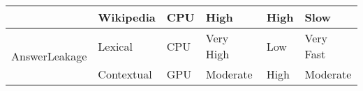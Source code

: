 \begin{table}[t]
{\begin{tabular}{@{}llllll@{}}
                               & Wikipedia        & CPU                                                                            & High                                                                             & High      & Slow                                                                          \\ \midrule
\multirow{2}{*}{AnswerLeakage} & Lexical          & CPU                                                                            & Very High                                                                        & Low       & Very Fast                                                                     \\
                               & Contextual       & GPU                                                                            & Moderate                                                                         & High      & Moderate                                                                      \\ \bottomrule
\end{tabular}%
}
\end{table}